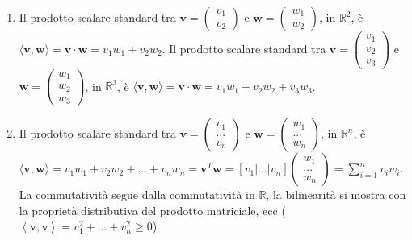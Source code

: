\documentclass{article}
\begin{document}
\begin{enumerate}
\item Il prodotto scalare standard tra $\mathbf{v}=\left( 
\begin{array}{c}
v_{1} \\ 
v_{2}%
\end{array}%
\right) $ e $\mathbf{w}=\left( 
\begin{array}{c}
w_{1} \\ 
w_{2}%
\end{array}%
\right) $, in $%
\mathbb{R}
^{2}$, \`{e} $\langle \mathbf{v,w}\rangle =\mathbf{v\cdot w}%
=v_{1}w_{1}+v_{2}w_{2}$. Il prodotto scalare standard tra $\mathbf{v}=\left( 
\begin{array}{c}
v_{1} \\ 
v_{2} \\ 
v_{3}%
\end{array}%
\right) $ e $\mathbf{w}=\left( 
\begin{array}{c}
w_{1} \\ 
w_{2} \\ 
w_{3}%
\end{array}%
\right) $, in $%
\mathbb{R}
^{3}$, \`{e} $\langle \mathbf{v,w}\rangle =\mathbf{v\cdot w}%
=v_{1}w_{1}+v_{2}w_{2}+v_{3}w_{3}$.

\item Il prodotto scalare standard tra $\mathbf{v}=\left( 
\begin{array}{c}
v_{1} \\ 
... \\ 
v_{n}%
\end{array}%
\right) $ e $\mathbf{w}=\left( 
\begin{array}{c}
w_{1} \\ 
... \\ 
w_{n}%
\end{array}%
\right) $, in $%
\mathbb{R}
^{n}$, \`{e} $\langle \mathbf{v,w}\rangle
=v_{1}w_{1}+v_{2}w_{2}+...+v_{n}w_{n}=\mathbf{v}^{T}\mathbf{w}=\left[
v_{1}|...|v_{n}\right] \left( 
\begin{array}{c}
w_{1} \\ 
... \\ 
w_{n}%
\end{array}%
\right) =\sum_{i=1}^{n}v_{i}w_{i}$. La commutativit\`{a} segue dalla
commutativit\`{a} in $%
\mathbb{R}
$, la bilinearit\`{a} si mostra con la propriet\`{a} distributiva del
prodotto matriciale, ecc ($\left\langle \mathbf{v,v}\right\rangle
=v_{1}^{2}+...+v_{n}^{2}\geq 0$).


\end{enumerate}
\end{document}
